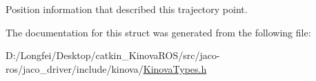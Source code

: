 Position information that described this trajectory point. 



The documentation for this struct was generated from the following file\+:\begin{DoxyCompactItemize}
\item 
D\+:/\+Longfei/\+Desktop/catkin\+\_\+\+Kinova\+R\+O\+S/src/jaco-\/ros/jaco\+\_\+driver/include/kinova/\hyperlink{KinovaTypes_8h}{Kinova\+Types.\+h}\end{DoxyCompactItemize}
